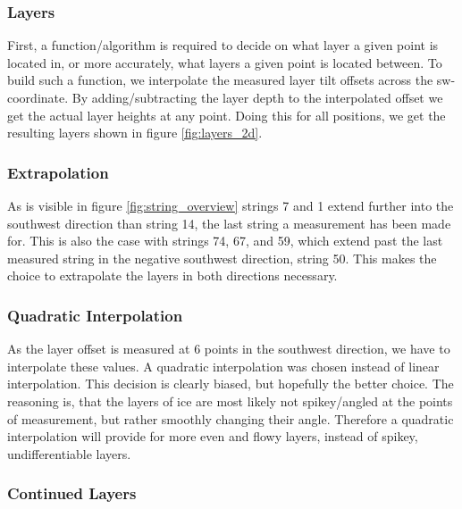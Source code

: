 \documentclass[a4paper,10pt]{scrartcl}
\begin{document}
\subsubsection{Layers}


First, a function/algorithm is required to decide on what layer a given point is located in, or more accurately, what layers a given point is located between.
To build such a function, we interpolate the measured layer tilt offsets across the sw-coordinate.
By adding/subtracting the layer depth to the interpolated offset we get the actual layer heights at any point.
Doing this for all positions, we get the resulting layers shown in figure \ref{fig:layers_2d}.

\subsubsection*{Extrapolation}

As is visible in figure \ref{fig:string_overview} strings 7 and 1 extend further into the southwest direction than string 14, the last string a measurement has been made for.
This is also the case with strings 74, 67, and 59, which extend past the last measured string in the negative southwest direction, string 50.
This makes the choice to extrapolate the layers in both directions necessary.

\subsubsection*{Quadratic Interpolation}

As the layer offset is measured at 6 points in the southwest direction, we have to interpolate these values.
A quadratic interpolation was chosen instead of linear interpolation.
This decision is clearly biased, but hopefully the better choice.
The reasoning is, that the layers of ice are most likely not spikey/angled at the points of measurement, but rather smoothly changing their angle.
Therefore a quadratic interpolation will provide for more even and flowy layers, instead of spikey, undifferentiable layers.

\subsubsection*{Continued Layers}
\end{document}
